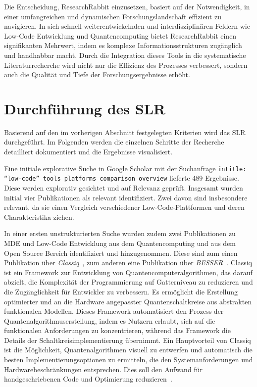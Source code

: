 Die Entscheidung, ResearchRabbit einzusetzen, basiert auf der Notwendigkeit, in einer umfangreichen und 
dynamischen Forschungslandschaft effizient zu navigieren. In sich schnell weiterentwickelnden und interdisziplinären 
Feldern wie Low-Code Entwicklung und Quantencomputing bietet ResearchRabbit einen signifikanten Mehrwert, 
indem es komplexe Informationsstrukturen zugänglich und handhabbar macht. Durch die Integration dieses Tools 
in die systematische Literaturrecherche wird nicht nur die Effizienz des Prozesses verbessert, sondern auch 
die Qualität und Tiefe der Forschungsergebnisse erhöht.

\section{Durchführung des SLR}
Basierend auf den im vorherigen Abschnitt festgelegten Kriterien wird das SLR
durchgeführt. Im Folgenden werden die einzelnen Schritte der Recherche detailliert dokumentiert und die Ergebnisse 
visualisiert. 


Eine initiale explorative Suche in Google Scholar mit der Suchanfrage \texttt{intitle: ``low-code'' tools platforms comparison overview} lieferte 489 
Ergebnisse. Diese werden explorativ gesichtet und auf Relevanz geprüft. Insgesamt wurden initial vier Publikationen 
als relevant identifiziert. Zwei davon sind insbesondere relevant, da sie einen Vergleich verschiedener 
Low-Code-Plattformen und deren Charakteristika ziehen. 

In einer ersten unstrukturierten Suche wurden zudem zwei Publikationen zu MDE und Low-Code Entwicklung aus dem Quantencomputing und 
aus dem Open Source Bereich identifiziert und hinzugenommen. Diese sind zum einen Publikation über \textit{Classiq}~\cite{minerbi2022quantum}, zum anderen 
eine Publikation über \textit{BESSER}~\cite{alfonso2024building}. 
Classiq ist ein Framework zur Entwicklung von Quantencomputeralgorithmen, das darauf abzielt, die Komplexität der Programmierung 
auf Gatterniveau zu reduzieren und die Zugänglichkeit für Entwickler zu verbessern. Es ermöglicht die Erstellung optimierter und 
an die Hardware angepasster Quantenschaltkreise aus abstrakten funktionalen Modellen. Dieses Framework automatisiert den Prozess der 
Quantenalgorithmuserstellung, indem es Nutzern erlaubt, sich auf die funktionalen Anforderungen zu konzentrieren, während das Framework 
die Details der Schaltkreisimplementierung übernimmt. Ein Hauptvorteil von Classiq ist die Möglichkeit, Quantenalgorithmen visuell zu 
entwerfen und automatisch die besten Implementierungsoptionen 
zu ermitteln, die den Systemanforderungen und Hardwarebeschränkungen entsprechen. Dies soll den Aufwand für handgeschriebenen Code und 
Optimierung reduzieren~\cite{minerbi2022quantum}. 

